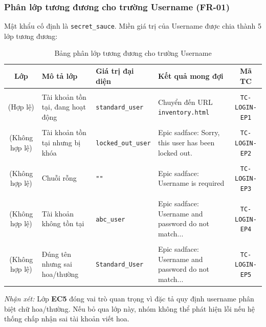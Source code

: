 \documentclass[a4paper]{article}
\renewcommand{\arraystretch}{1.25}
\begin{document}
\subsubsection{Phân lớp tương đương cho trường Username (FR-01)}
Mật khẩu cố định là \texttt{secret\_sauce}. Miền giá trị của Username được chia thành 5 lớp tương đương:
\begin{table}[H]
\centering
\small
\renewcommand{\arraystretch}{1.15}
\begin{tabularx}{\textwidth}{|c|>{\raggedright\arraybackslash}p{4cm}|l|>{\raggedright\arraybackslash}X|c|}
\hline
\textbf{Lớp} & \textbf{Mô tả lớp} & \textbf{Giá trị đại diện} & \textbf{Kết quả mong đợi} & \textbf{Mã TC} \\ \hline
\makecell[t]{\textbf{EC1}\\\scriptsize(Hợp lệ)} & Tài khoản tồn tại, đang hoạt động & \texttt{standard\_user} & Chuyển đến URL \texttt{inventory.html} & \texttt{TC-LOGIN-EP1} \\ \hline
\makecell[t]{\textbf{EC2}\\\scriptsize(Không hợp lệ)} & Tài khoản tồn tại nhưng bị khóa & \texttt{locked\_out\_user} & Epic sadface: Sorry, this user has been locked out. & \texttt{TC-LOGIN-EP2} \\ \hline
\makecell[t]{\textbf{EC3}\\\scriptsize(Không hợp lệ)} & Chuỗi rỗng & \texttt{""} & Epic sadface: Username is required & \texttt{TC-LOGIN-EP3} \\ \hline
\makecell[t]{\textbf{EC4}\\\scriptsize(Không hợp lệ)} & Tài khoản không tồn tại & \texttt{abc\_user} & Epic sadface: Username and password do not match... & \texttt{TC-LOGIN-EP4} \\ \hline
\makecell[t]{\textbf{EC5}\\\scriptsize(Không hợp lệ)} & Đúng tên nhưng sai hoa/thường & \texttt{Standard\_User} & Epic sadface: Username and password do not match... & \texttt{TC-LOGIN-EP5} \\ \hline
\end{tabularx}
\caption{Bảng phân lớp tương đương cho trường Username}
\end{table}

\noindent \textit{Nhận xét:} Lớp \textbf{EC5} đóng vai trò quan trọng vì đặc tả quy định username phân biệt chữ hoa/thường. Nếu bỏ qua lớp này, nhóm không thể phát hiện lỗi nếu hệ thống chấp nhận sai tài khoản viết hoa.
\end{document}
